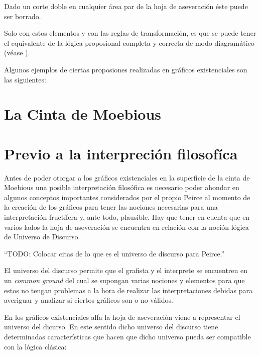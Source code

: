 \documentclass[
	fontsize=10pt, %
	twoside=false, %
	secnumdepth=1, %
	abstract=true, %
]{kaohandt}
\begin{document}
\begin{definition}
	Dado un corte doble en cualquier área par de la hoja de aseveración éste puede ser borrado.
\end{definition}

Solo con estos elementos y con las reglas de transformación, es que se puede tener el equivalente de la lógica proposional completa y correcta de modo diagramático (véase \cite{roberts1973}).

Algunos ejemplos de ciertas proposiones realizadas en gráficos existenciales son las siguientes:

\section{La Cinta de Moebious} %
\label{sec:La Cinta de Moebious}


\section{Previo a la interpreción filosofíca} %
\label{sec:Previo a la interpreción filosofíca}

Antes de poder otorgar a los gráficos existenciales en la superficie de la cinta de Moebious una posible interpretación filosófica es necesario poder ahondar en algunos conceptos importantes considerados por el propio Peirce al momento de la creación de los gráficos para tener las nociones necesarias para una interpretación fructífera y, ante todo, plausible. Hay que tener en cuenta que en varios lados la hoja de aseveración se encuentra en relación con la noción lógica de Universo de Discurso.

\enquote{TODO: Colocar citas de lo que es el universo de discurso para Peirce.}

El universo del discurso permite que el grafista y el interprete se encuentren en un \textit{common ground} del cual se supongan varias nociones y elementos para que estos no tengan problemas a la hora de realizar las interpretaciones debidas para averiguar y analizar si ciertos gráficos son o no válidos.

En los gráficos existenciales alfa la hoja de aseveración viene a representar el universo del dicurso. En este sentido dicho universo del discurso tiene determinadas características que hacen que dicho universo pueda ser compatible con la lógica clásica:
\end{document}
